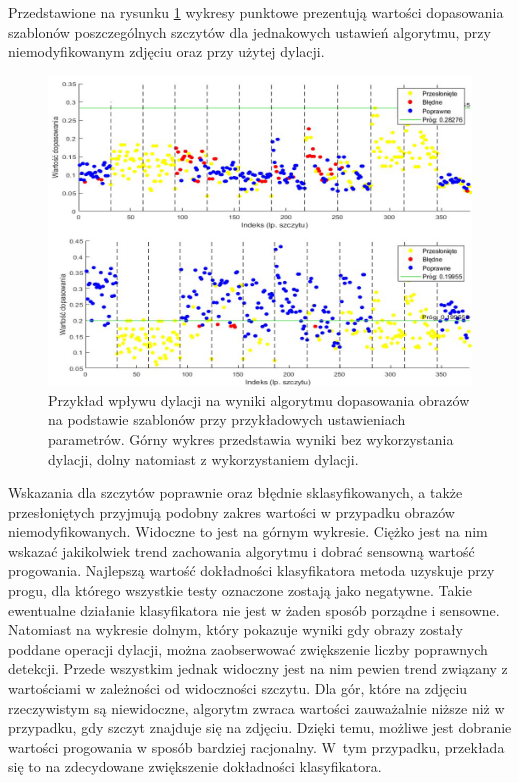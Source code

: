 Przedstawione na rysunku \ref{fig:dilation_graph} wykresy punktowe prezentują wartości dopasowania szablonów poszczególnych szczytów dla jednakowych ustawień algorytmu, przy niemodyfikowanym zdjęciu oraz przy użytej dylacji. 

\begin{figure}[!h]
    \centering \includegraphics[width=0.93\linewidth]{img/dilation_graph.png}
    \caption{Przykład wpływu dylacji na wyniki algorytmu dopasowania obrazów na podstawie szablonów przy przykładowych ustawieniach parametrów. Górny wykres przedstawia wyniki bez wykorzystania dylacji, dolny natomiast z wykorzystaniem dylacji.}
    \label{fig:dilation_graph}
\end{figure}

Wskazania dla szczytów poprawnie oraz błędnie sklasyfikowanych, a także przesłoniętych przyjmują podobny zakres wartości w przypadku obrazów niemodyfikowanych. Widoczne to jest na górnym wykresie. Ciężko jest na nim wskazać jakikolwiek trend zachowania algorytmu i dobrać sensowną wartość progowania. Najlepszą wartość dokładności klasyfikatora metoda uzyskuje przy progu, dla którego wszystkie testy oznaczone zostają jako negatywne. Takie ewentualne działanie klasyfikatora nie jest w żaden sposób porządne i sensowne. Natomiast na wykresie dolnym, który pokazuje wyniki gdy obrazy zostały poddane operacji dylacji, można zaobserwować zwiększenie liczby poprawnych detekcji. Przede wszystkim jednak widoczny jest na nim pewien trend związany z wartościami w zależności od widoczności szczytu. Dla gór, które na zdjęciu rzeczywistym są niewidoczne, algorytm zwraca wartości zauważalnie niższe niż w przypadku, gdy szczyt znajduje się na zdjęciu. Dzięki temu, możliwe jest dobranie wartości progowania w sposób bardziej racjonalny. W~tym przypadku, przekłada się to na zdecydowane zwiększenie dokładności klasyfikatora. 


